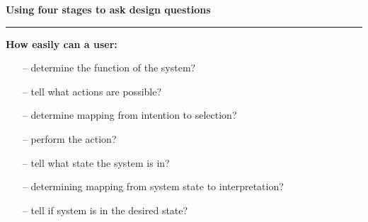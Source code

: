 \documentclass[pdf]{beamer}
\begin{document}
\begin{frame} 
\vspace{8mm}
\textcolor{myBlue}{\textbf{\Large{Using four stages to ask design questions}}}

\textcolor{red}{\rule{10cm}{1mm}}

\textbf{How easily can a user:}

	\begin{itemize} 
    	\itemsep0.35em
    	\item[\textcolor{black}{--}] determine the function of the system?
        \item[\textcolor{black}{--}] tell what actions are possible?
        \item[\textcolor{black}{--}] determine mapping from intention to selection?
        \item[\textcolor{black}{--}] perform the action?
        \item[\textcolor{black}{--}] tell what state the system is in?
        \item[\textcolor{black}{--}] determining mapping from system state to interpretation?
        \item[\textcolor{black}{--}] tell if system is in the desired state?
  	\end{itemize}
\end{frame}
\end{document}
